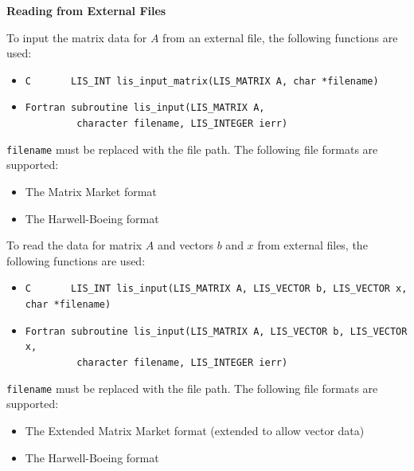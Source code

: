 \documentclass[a4paper]{article}
\begin{document}
\noindent
{\bf Reading from External Files}

To input the matrix data for $A$ from an external file,
the following functions are used:
\begin{itemize}
\item \verb|C       LIS_INT lis_input_matrix(LIS_MATRIX A, char *filename)|
\item \verb|Fortran subroutine lis_input(LIS_MATRIX A,|\\
      \verb|         character filename, LIS_INTEGER ierr)|
\end{itemize}
{\tt filename} must be replaced with the file path.
The following file formats are supported:

\begin{itemize}
\item The Matrix Market format
\item The Harwell-Boeing format
\end{itemize}

To read the data for matrix $A$ and vectors $b$ and $x$ from
external files, the following functions are used:
\begin{itemize}
\item \verb|C       LIS_INT lis_input(LIS_MATRIX A, LIS_VECTOR b, LIS_VECTOR x, char *filename)|
\item \verb|Fortran subroutine lis_input(LIS_MATRIX A, LIS_VECTOR b, LIS_VECTOR x,|\\
      \verb|         character filename, LIS_INTEGER ierr)|
\end{itemize}
{\tt filename} must be replaced with the file path.
The following file formats are supported:

\begin{itemize}
\item The Extended Matrix Market format (extended to allow vector data)
\item The Harwell-Boeing format
\end{itemize}
\end{document}
